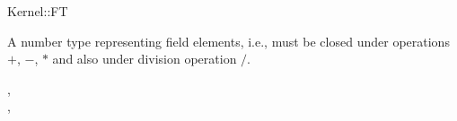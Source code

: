 \begin{ccRefConcept}{Kernel::FT}

A number type representing field elements, i.e., must be closed under
operations $+$, $-$, $*$ and also under division operation $/$.

\ccRefines
{}, \\ 
, 
\end{ccRefConcept}
